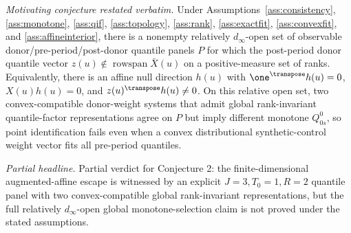 
\begin{proposition}\label{prop:escape-partial}
\emph{Motivating conjecture restated verbatim.}
Under Assumptions~\ref{ass:consistency}, \ref{ass:monotone}, \ref{ass:qif}, \ref{ass:topology}, \ref{ass:rank}, \ref{ass:exactfit}, \ref{ass:convexfit}, and \ref{ass:affineinterior}, there is a nonempty relatively \(d_\infty\)-open set of observable donor/pre-period/post-donor quantile panels \(P\) for which the post-period donor quantile vector \(z(u)\notin\operatorname{rowspan}\bar X(u)\) on a positive-measure set of ranks.  Equivalently, there is an affine null direction \(h(u)\) with \(\one^\transpose h(u)=0\), \(X(u)h(u)=0\), and \(z(u)^\transpose h(u)\ne0\).  On this relative open set, two convex-compatible donor-weight systems that admit global rank-invariant quantile-factor representations agree on \(P\) but imply different monotone \(Q^0_{0s}\), so point identification fails even when a convex distributional synthetic-control weight vector fits all pre-period quantiles.

\emph{Partial headline.}
Partial verdict for Conjecture 2: the finite-dimensional augmented-affine escape is witnessed by an explicit \(J=3,T_0=1,R=2\) quantile panel with two convex-compatible global rank-invariant representations, but the full relatively \(d_\infty\)-open global monotone-selection claim is not proved under the stated assumptions.
\end{proposition}

